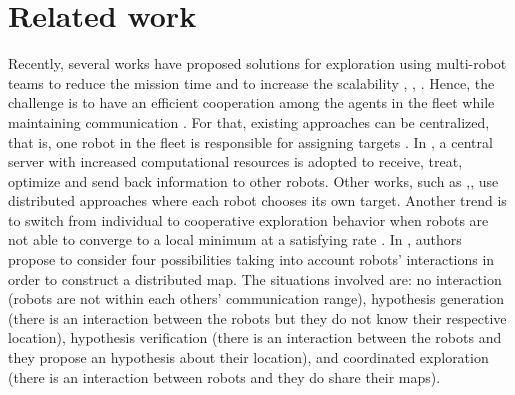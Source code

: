 \documentclass[11pt,openany]{book}
\begin{document}
\section{Related work}
Recently, several works have proposed solutions for exploration using multi-robot teams to reduce the mission time and to increase the scalability \cite{bautin2012strategie}, \cite{jensen2013rolling}, \cite{yan2014team}. Hence, the challenge is to have an eﬃcient cooperation among the agents in the ﬂeet while maintaining communication \cite{rooker2007multi}. For that, existing approaches can be centralized, that is, one robot in the ﬂeet is responsible for assigning targets \cite{burgard2000collaborative}. In \cite{schmuck2017multi}, a central server with increased computational resources is adopted to receive, treat, optimize and send back information to other robots. Other works, such as \cite{yuan2010cooperative},\cite{sheng2006distributed}, use distributed approaches where each robot chooses its own target. Another trend is to switch from individual to cooperative exploration behavior when robots are not able to converge to a local minimum at a satisfying rate \cite{wu2012robust}. In \cite{konolige2003map}, authors propose to consider four possibilities taking into account robots’ interactions in order to construct a distributed map. The situations involved are: no interaction (robots are not within each others’ communication range), hypothesis generation (there is an interaction between the robots but they do not know their respective location), hypothesis verification (there is an interaction between the robots and they propose an hypothesis about their location), and coordinated exploration (there is an interaction between robots and they do share their maps).
\end{document}
